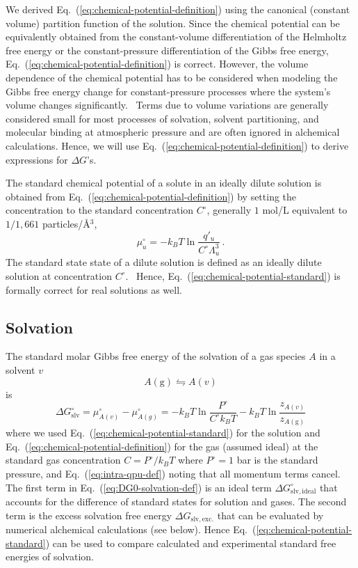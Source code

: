 \documentclass[9pt,bestpractices]{livecoms}
\begin{document}
We derived Eq.~(\ref{eq:chemical-potential-definition}) using the canonical (constant volume) partition function of the solution. Since the chemical potential can be equivalently obtained from the constant-volume differentiation of the Helmholtz free energy or the constant-pressure differentiation of the Gibbs free energy, Eq.~(\ref{eq:chemical-potential-definition}) is correct. However, the volume dependence of the chemical potential has to be considered when modeling the Gibbs free energy change for constant-pressure processes where the system's volume changes significantly.~\cite{gilson1997statisticalthermodynamic} Terms due to volume variations are generally considered small for most processes of solvation, solvent partitioning, and molecular binding at atmospheric pressure and are often ignored in alchemical calculations. Hence, we will use Eq.~(\ref{eq:chemical-potential-definition}) to derive expressions for $\Delta G$'s.

The standard chemical potential of a solute in an ideally dilute solution is obtained from Eq.~(\ref{eq:chemical-potential-definition}) by setting the concentration to the standard concentration $C^\circ$, generally $1$ mol/L equivalent to $1/1,661$ particles/\AA$^{3}$, 
\begin{equation}
  \mu_u^\circ = -k_B T \ln \frac{q'_u}{C^\circ \Lambda_u^3} \, .
  \label{eq:chemical-potential-standard}
\end{equation}
The standard state state of a dilute solution is defined as an ideally dilute solution at concentration $C^\circ$.~\cite{levine2009physicalchemistrybook6ed} Hence, Eq.~(\ref{eq:chemical-potential-standard}) is formally correct for real solutions as well.

\subsection{Solvation}


The standard molar Gibbs free energy of the solvation of a gas species $A$ in a solvent $v$
\begin{equation}
A(\mathrm{g})  \leftrightharpoons A(v)
\end{equation}
is
\begin{equation}
  \Delta G^\circ_{\mathrm{slv}} = \mu^\circ_{A(v)}  - \mu^\circ_{A(g)} = -k_B T \ln \frac{P^\circ}{C^\circ k_B T} - k_B T \ln \frac{z_{A(v)}}{z_{A(\mathrm{g})}}
  \label{eq:DG0-solvation-def}
\end{equation}
where we used Eq.~(\ref{eq:chemical-potential-standard}) for the solution and  Eq.~(\ref{eq:chemical-potential-definition}) for the gas (assumed ideal) at the standard gas concentration $C = P^\circ/k_B T$ where $P^\circ = 1$ bar is the standard pressure, and Eq.~(\ref{eq:intra-qpu-def}) noting that all momentum terms cancel. The first term in Eq.~(\ref{eq:DG0-solvation-def}) is an ideal term $\Delta G^\circ_{\mathrm{slv,ideal}}$ that accounts for the difference of standard states for solution and gases. The second term is the excess solvation free energy $\Delta G_{\mathrm{slv, exc.}}$ that can be evaluated by numerical alchemical calculations (see below). Hence Eq.~(\ref{eq:chemical-potential-standard}) can be used to compare calculated and experimental standard free energies of solvation.
\end{document}
